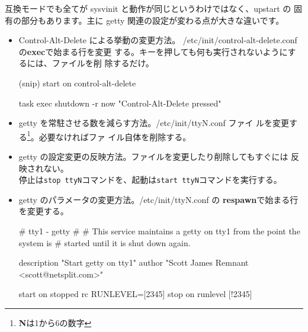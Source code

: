 \documentclass[mingoth,a4paper]{jsarticle}
\begin{document}
互換モードでも全てが sysvinit と動作が同じというわけではなく、upstart の
固有の部分もあります。主に getty 関連の設定が変わる点が大きな違いです。

\begin{itemize}
 \item Control-Alt-Delete による挙動の変更方法。
       /etc/init/control-alt-delete.confの\textbf{exec}で始まる行を変更
       する。キーを押しても何も実行されないようにするには、ファイルを削
       除するだけ。
\begin{commandline}
(snip)
start on control-alt-delete

task
exec shutdown -r now "Control-Alt-Delete pressed"
\end{commandline}
 \item getty を常駐させる数を減らす方法。/etc/init/ttyN.conf ファイ
       ルを変更する\footnote{\textbf{N}は1から6の数字}。必要なければファ
       イル自体を削除する。
 \item getty の設定変更の反映方法。ファイルを変更したり削除してもすぐには
       反映されない。\\
       停止は\texttt{stop ttyN}コマンドを、起動は\texttt{start ttyN}コマンドを実行する。
 \item getty のパラメータの変更方法。/etc/init/ttyN.conf の
       \textbf{respawn}で始まる行を変更する。
\begin{commandline}
# tty1 - getty
#
# This service maintains a getty on tty1 from the point the system is
# started until it is shut down again.

description     "Start getty on tty1"
author          "Scott James Remnant <scott@netsplit.com>"

start on stopped rc RUNLEVEL=[2345]
stop on runlevel [!2345]


\end{commandline}
\end{itemize}
\end{document}
